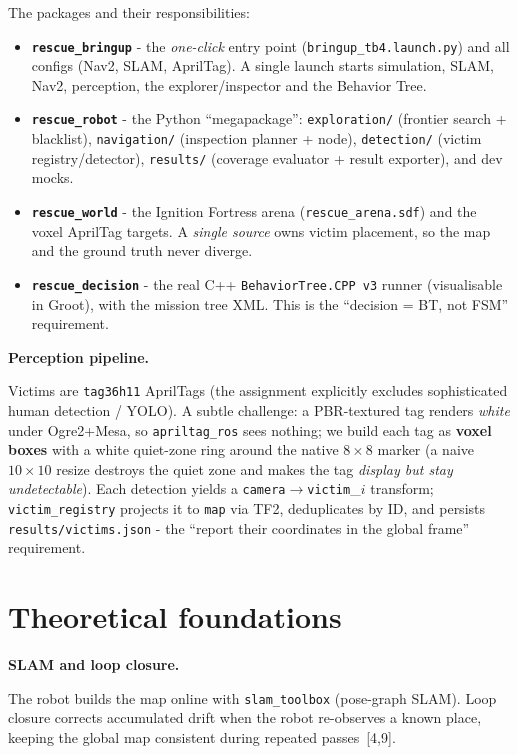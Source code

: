 \documentclass[11pt,a4paper]{article}
\newcommand{\head}[1]{\par\smallskip\noindent\textbf{\color{nccblue}#1}\par}
\begin{document}
\noindent The packages and their responsibilities:
\begin{itemize}
\item \textbf{\texttt{rescue\_bringup}} - the \emph{one-click} entry point
(\texttt{bringup\_tb4.launch.py}) and all configs (Nav2, SLAM, AprilTag). A single launch starts
simulation, SLAM, Nav2, perception, the explorer/inspector and the Behavior Tree.
\item \textbf{\texttt{rescue\_robot}} - the Python ``megapackage'': \texttt{exploration/}
(frontier search + blacklist), \texttt{navigation/} (inspection planner + node), \texttt{detection/}
(victim registry/detector), \texttt{results/} (coverage evaluator + result exporter), and dev mocks.
\item \textbf{\texttt{rescue\_world}} - the Ignition Fortress arena (\texttt{rescue\_arena.sdf}) and
the voxel AprilTag targets. A \emph{single source} owns victim placement, so the map and the ground
truth never diverge.
\item \textbf{\texttt{rescue\_decision}} - the real C++ \texttt{BehaviorTree.CPP\,v3} runner
(visualisable in Groot), with the mission tree XML. This is the ``decision = BT, not FSM'' requirement.
\end{itemize}

\head{Perception pipeline.} Victims are \texttt{tag36h11} AprilTags (the assignment explicitly
excludes sophisticated human detection / YOLO). A subtle challenge: a PBR-textured tag renders
\emph{white} under Ogre2+Mesa, so \texttt{apriltag\_ros} sees nothing; we build each tag as
\textbf{voxel boxes} with a white quiet-zone ring around the native $8{\times}8$ marker (a naive
$10{\times}10$ resize destroys the quiet zone and makes the tag \emph{display but stay undetectable}).
Each detection yields a \texttt{camera}$\to$\texttt{victim}\_$i$ transform; \texttt{victim\_registry}
projects it to \texttt{map} via TF2, deduplicates by ID, and persists \texttt{results/victims.json} -
the ``report their coordinates in the global frame'' requirement.

\section{Theoretical foundations}\label{sec:concepts}
\head{SLAM and loop closure.} The robot builds the map online with \texttt{slam\_toolbox} (pose-graph
SLAM). Loop closure corrects accumulated drift when the robot
re-observes a known place, keeping the global map consistent during repeated passes~[4,9].
\end{document}
